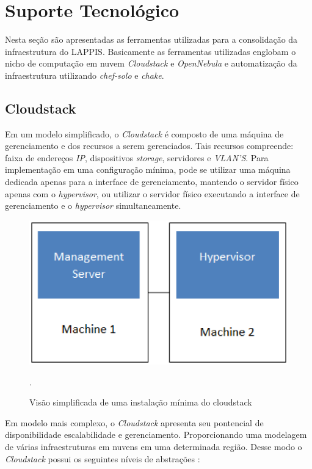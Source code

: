 \chapter{Suporte Tecnológico}

Nesta seção são apresentadas as ferramentas utilizadas para a consolidação da infraestrutura do LAPPIS. Basicamente as ferramentas utilizadas englobam o nicho de computação em nuvem \textit{Cloudstack} e \textit{OpenNebula} e automatização da infraestrutura utilizando \textit{chef-solo} e \textit{chake}.
\section{Cloudstack}
Em um modelo simplificado, o \textit{Cloudstack} é composto de uma máquina de gerenciamento e dos recursos a serem gerenciados. Tais recursos compreende: faixa de endereços \textit{IP}, dispositivos \textit{storage}, servidores e \textit{VLAN'S}. Para implementação em uma configuração mínima, pode se utilizar uma máquina dedicada apenas para a interface de gerenciamento, mantendo o servidor físico apenas com o \textit{hypervisor}, ou utilizar o servidor físico executando a interface de gerenciamento e o \textit{hypervisor} simultaneamente. 

\begin{figure}[!htb]
\centering
\includegraphics [keepaspectratio=true,scale=0.60]{figuras/cloudstack_minimal.eps}
\caption{Visão simplificada de uma instalação mínima do cloudstack}
\cite{cloudstack}.
\label{cloudstatck_minimal}
\end{figure}

Em modelo mais complexo, o \textit{Cloudstack} apresenta seu pontencial de disponibilidade escalabilidade e gerenciamento. Proporcionando uma modelagem de várias infraestruturas em nuvens em uma determinada região. Desse modo o \textit{Cloudstack} possui os seguintes níveis de abstrações \cite{shape}:

